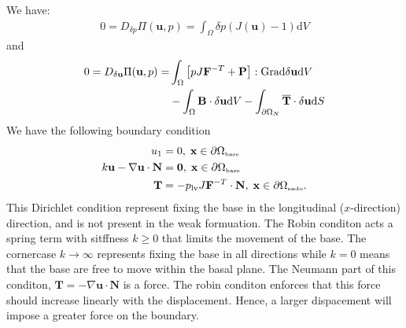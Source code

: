 We have:
\begin{align}
  0 = D_{\delta p} \Pi(\mathbf{u}, p)
  = \int_{\Omega}  \delta p(J(\mathbf{u}) - 1) \mathrm{d}V
\end{align}
and
\begin{align}
  \begin{split}
  0 = D_{\delta \mathbf{u}} \Pi(\mathbf{u}, p) %
  =&  \int_{\Omega}  \left[ pJ \mathbf{F}^{-T} + \mathbf{P} \right] : \Grad \delta \mathbf{u} \mathrm{d}V\\ 
  &- \int_{\Omega} \mathbf{B} \cdot \delta \mathbf{u} \mathrm{d} V - \int_{\partial \Omega_N} \overline{\mathbf{T}} \cdot \delta \mathbf{u} \mathrm{d}S
  \end{split}
\end{align}
We have the following boundary condition
\begin{align}
  u_1 &= 0 , \;  \mathbf{x} \in \partial \Omega_{ \textnormal{\tiny\text{base}}} \\
  k\mathbf{u} - \nabla \mathbf{u} \cdot  \mathbf{N}  &= \mathbf{0} , \;  \mathbf{x} \in \partial \Omega_{ \textnormal{\tiny\text{base}}} \\
  \mathbf{T} &= -p_{\mathrm{lv}} J\mathbf{F}^{-T} \cdot \mathbf{N}, \;  \mathbf{x} \in \partial \Omega_{ \textnormal{\tiny \text{endo}}}.
\end{align}
This Dirichlet condition represent fixing the base in the longitudinal ($x$-direction)
direction, and is not present in the weak formuation.
The Robin conditon acts a spring term with sitffness $k \geq 0$ that limits the movement of the
base. The cornercase $k \rightarrow \infty$ represents fixing the base
in all directions while $k = 0$ means that the base are free to move
within the basal plane. The Neumann part of this conditon, $
\mathbf{T} = - \nabla \mathbf{u} \cdot  \mathbf{N}$ is a force. The
robin conditon  enforces that this force should increase linearly with
the displacement. Hence, a larger dispacement will impose a greater
force on the boundary. 
